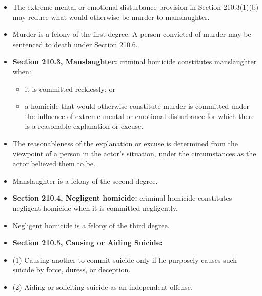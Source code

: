 \documentclass[11pt]{tex/lawoutline}
\begin{document}
{\begin{itemize}
    \item The extreme mental or emotional disturbance provision in Section 210.3(1)(b) may reduce what would otherwise be murder to manslaughter.

    \item Murder is a felony of the first degree. A person convicted of murder may be sentenced to death under Section 210.6.

    \item \textbf{Section 210.3, Manslaughter:} criminal homicide constitutes manslaughter when:
    \begin{itemize}
        \item it is committed recklessly; or
        \item a homicide that would otherwise constitute murder is committed under the influence of extreme mental or emotional disturbance for which there is a reasonable explanation or excuse.
    \end{itemize}

    \item The reasonableness of the explanation or excuse is determined from the viewpoint of a person in the actor's situation, under the circumstances as the actor believed them to be.

    \item Manslaughter is a felony of the second degree.

    \item \textbf{Section 210.4, Negligent homicide:} criminal homicide constitutes negligent homicide when it is committed negligently.

    \item Negligent homicide is a felony of the third degree.

    \item \textbf{Section 210.5, Causing or Aiding Suicide:} 
    \item (1) Causing another to commit suicide only if he purposely causes such suicide by force, duress, or deception. 
    \item (2) Aiding or soliciting suicide as an independent offense. 
\end{itemize}
}
\end{document}
